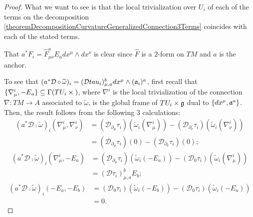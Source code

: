 \begin{proof}
What we want to see is that the local trivialization over $U_i$ of each of the terms on the decomposition \ref{theoremDecompositionCurvatureGeneralizedConnection3Terms} coincides with each of the stated terms.

That $a^*F_i = \hat F^a_{\mu \nu} E_a dx^\mu \wedge dx^\nu$ is clear since $\hat F$ is a $2$-form on $TM$ and $a$ is the anchor.

To see that $(a^* \mathcal D \operatorname{\circ} \widetilde \omega)_i = (\mathcal D tau_i)^b_{\mu, a} dx^\mu \wedge (\mathfrak{a}_i)^a$, first recall that $\{\nabla^i_\mu, -E_a\} \subseteq \Gamma(TU_i \times \mathfrak{)}$, where $\nabla^i$ is the local trivialization of the connection $\nabla:TM \to A$ associated to $\tilde \omega$, is the global frame of $TU_i \times \mathfrak{g}$ dual to $\{dx^\mu, \mathfrak{a}^a\}$. Then, the result follows from the following $3$ calculations:
\begin{align*}
    (a^* \mathcal D \comp \tilde \omega)_i(\nabla^i_\mu, \nabla^i_\nu) 
        &= (\mathcal D_{\partial_\mu} \tau_i) (\tilde \omega_i(\nabla^i_\mu)) - (\mathcal D_{\partial_\nu} \tau_i) (\tilde \omega_i(\nabla^i_\nu))\\
        &= (\mathcal D_{\partial_\mu} \tau_i) (0) - (\mathcal D_{\partial_\nu} \tau_i)(0);
\end{align*}
\begin{align*}
    (a^* \mathcal D \comp \tilde \omega)_i(\nabla^i_\mu, -E_a) 
        &= (\mathcal D_{\partial_\mu} \tau_i) (\tilde \omega_i(-E_a)) - (\mathcal D_{0} \tau_i) (\tilde \omega_i(\nabla^i_\mu))\\
        &= (\mathcal D \tau_i)^b_{\mu, a} E_b;
\end{align*}
\begin{align*}
    (a^* \mathcal D \comp \tilde \omega)_i(-E_a, -E_b) 
        &= (\mathcal D_{0} \tau_i) (\tilde \omega_i(-E_b)) - (\mathcal D_{0} \tau_i) (\tilde \omega_i(-E_a))\\
        &= 0.
\end{align*}


\end{proof}
